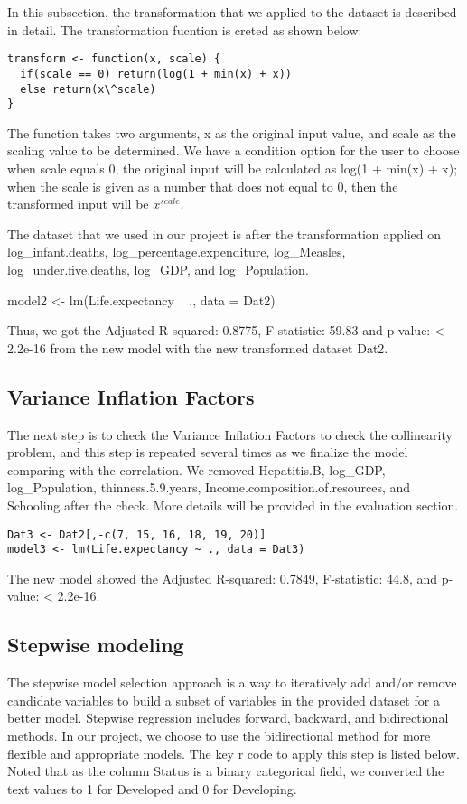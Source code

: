 In this subsection, the transformation that we applied to the dataset is described in detail. The transformation fucntion is creted as shown below:

\begin{verbatim}
transform <- function(x, scale) {
  if(scale == 0) return(log(1 + min(x) + x))
  else return(x\^scale)
}
\end{verbatim}

The function takes two arguments, x as the original input value, and scale as the scaling value to be determined. We have a condition option for the user to choose when scale equals 0, the original input will be calculated as log(1 + min(x) + x); when the scale is given as a number that does not equal to 0, then the transformed input will be $x^{scale}$.

The dataset that we used in our project is after the transformation applied on log\_infant.deaths, log\_percentage.expenditure, log\_Measles, log\_under.five.deaths, log\_GDP, and log\_Population.

model2 <- lm(Life.expectancy ~ ., data = Dat2)

Thus, we got the Adjusted R-squared: 0.8775, F-statistic: 59.83 and p-value: < 2.2e-16 from the new model with the new transformed dataset Dat2.

\subsection{Variance Inflation Factors}

The next step is to check the Variance Inflation Factors to check the collinearity problem, and this step is repeated several times as we finalize the model comparing with the correlation. We removed Hepatitis.B, log\_GDP, log\_Population, thinness.5.9.years, Income.composition.of.resources, and Schooling after the check. More details will be provided in the evaluation section.


\begin{verbatim}
Dat3 <- Dat2[,-c(7, 15, 16, 18, 19, 20)]
model3 <- lm(Life.expectancy ~ ., data = Dat3)
\end{verbatim}
The new model showed the Adjusted R-squared: 0.7849, F-statistic:  44.8, and p-value: < 2.2e-16.


\subsection{Stepwise modeling}

The stepwise model selection approach is a way to iteratively add and/or remove candidate variables to build a subset of variables in the provided dataset for a better model. Stepwise regression includes forward, backward, and bidirectional methods. In our project, we choose to use the bidirectional method for more flexible and appropriate models. The key r code to apply this step is listed below. Noted that as the column Status is a binary categorical field, we converted the text values to 1 for Developed and 0 for Developing.

